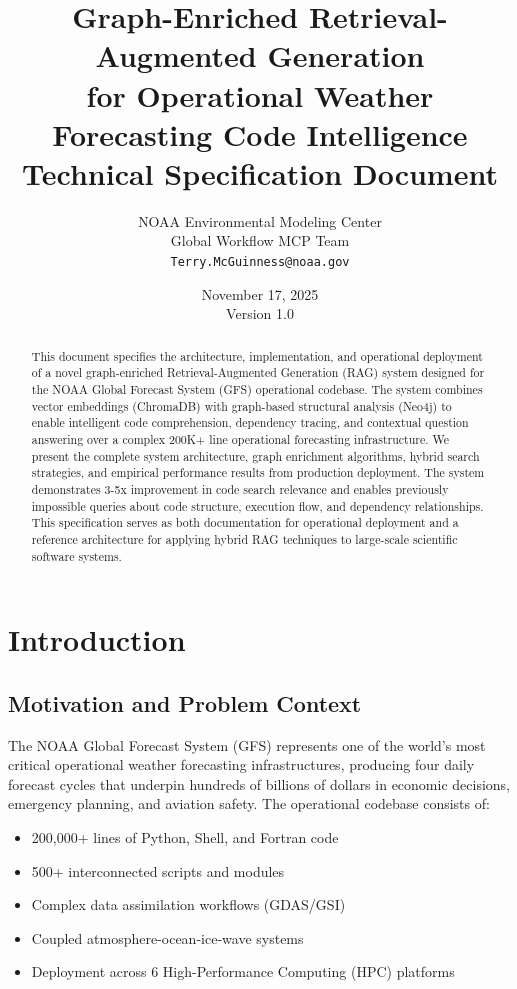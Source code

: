 \documentclass[11pt,letterpaper]{article}
\title{
    \textbf{Graph-Enriched Retrieval-Augmented Generation} \\
    \textbf{for Operational Weather Forecasting Code Intelligence} \\
    \vspace{0.5cm}
    \large Technical Specification Document
}
\author{
    NOAA Environmental Modeling Center \\
    Global Workflow MCP Team \\
    \texttt{Terry.McGuinness@noaa.gov}
}
\date{November 17, 2025 \\ Version 1.0}
\begin{document}
\maketitle

\begin{abstract}
This document specifies the architecture, implementation, and operational deployment of a novel graph-enriched Retrieval-Augmented Generation (RAG) system designed for the NOAA Global Forecast System (GFS) operational codebase. The system combines vector embeddings (ChromaDB) with graph-based structural analysis (Neo4j) to enable intelligent code comprehension, dependency tracing, and contextual question answering over a complex 200K+ line operational forecasting infrastructure. We present the complete system architecture, graph enrichment algorithms, hybrid search strategies, and empirical performance results from production deployment. The system demonstrates 3-5x improvement in code search relevance and enables previously impossible queries about code structure, execution flow, and dependency relationships. This specification serves as both documentation for operational deployment and a reference architecture for applying hybrid RAG techniques to large-scale scientific software systems.
\end{abstract}

\tableofcontents
\newpage

\section{Introduction}

\subsection{Motivation and Problem Context}

The NOAA Global Forecast System (GFS) represents one of the world's most critical operational weather forecasting infrastructures, producing four daily forecast cycles that underpin hundreds of billions of dollars in economic decisions, emergency planning, and aviation safety. The operational codebase consists of:

\begin{itemize}
    \item 200,000+ lines of Python, Shell, and Fortran code
    \item 500+ interconnected scripts and modules
    \item Complex data assimilation workflows (GDAS/GSI)
    \item Coupled atmosphere-ocean-ice-wave systems
    \item Deployment across 6 High-Performance Computing (HPC) platforms
\end{itemize}
\end{document}
